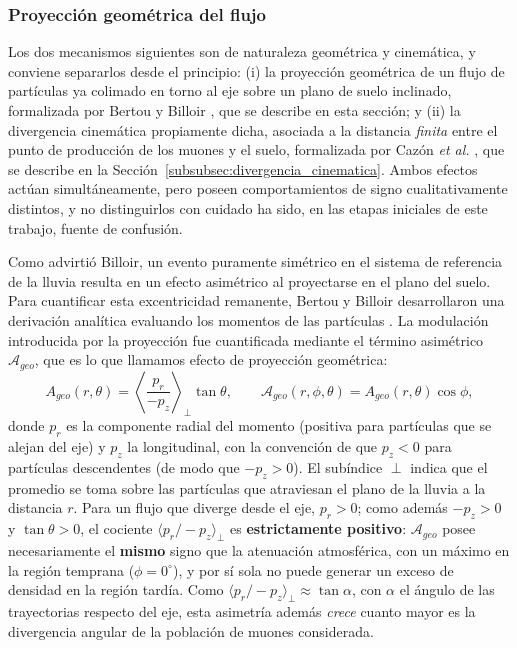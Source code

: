 \subsubsection{Proyección geométrica del flujo}
\label{subsubsec:divergencia}

Los dos mecanismos siguientes son de naturaleza geométrica y cinemática, y conviene separarlos desde el principio: (i) la proyección geométrica de un flujo de partículas ya colimado en torno al eje sobre un plano de suelo inclinado, formalizada por Bertou y Billoir \cite{GAP2000_017}, que se describe en esta sección; y (ii) la divergencia cinemática propiamente dicha, asociada a la distancia \textit{finita} entre el punto de producción de los muones y el suelo, formalizada por Cazón \textit{et al.} \cite{Cazon2012}, que se describe en la Sección~\ref{subsubsec:divergencia_cinematica}. Ambos efectos actúan simultáneamente, pero poseen comportamientos de signo cualitativamente distintos, y no distinguirlos con cuidado ha sido, en las etapas iniciales de este trabajo, fuente de confusión.

Como advirtió Billoir, un evento puramente simétrico en el sistema de referencia de la lluvia resulta en un efecto asimétrico al proyectarse en el plano del suelo. Para cuantificar esta excentricidad remanente, Bertou y Billoir desarrollaron una derivación analítica evaluando los momentos de las partículas \cite{GAP2000_017}. La modulación introducida por la proyección fue cuantificada mediante el término asimétrico $\mathcal{A}_{geo}$, que es lo que llamamos efecto de proyección geométrica:
\begin{equation}
	A_{geo}(r,\theta) = \left\langle \frac{p_r}{-p_z} \right\rangle_{\!\perp} \tan\theta,
	\qquad
	\mathcal{A}_{geo}(r,\phi,\theta) = A_{geo}(r,\theta)\cos\phi,
	\label{eq:efecto_geo}
\end{equation}
donde $p_r$ es la componente radial del momento (positiva para partículas que se alejan del eje) y $p_z$ la longitudinal, con la convención de que $p_z < 0$ para partículas descendentes (de modo que $-p_z > 0$). El subíndice $\perp$ indica que el promedio se toma sobre las partículas que atraviesan el plano de la lluvia a la distancia $r$. Para un flujo que diverge desde el eje, $p_r > 0$; como además $-p_z > 0$ y $\tan\theta > 0$, el cociente $\langle p_r/-p_z \rangle_\perp$ es \textbf{estrictamente positivo}: $\mathcal{A}_{geo}$ posee necesariamente el \textbf{mismo} signo que la atenuación atmosférica, con un máximo en la región temprana ($\phi = 0^\circ$), y por sí sola no puede generar un exceso de densidad en la región tardía. Como $\langle p_r/-p_z\rangle_\perp \approx \tan\alpha$, con $\alpha$ el ángulo de las trayectorias respecto del eje, esta asimetría además \textit{crece} cuanto mayor es la divergencia angular de la población de muones considerada.

